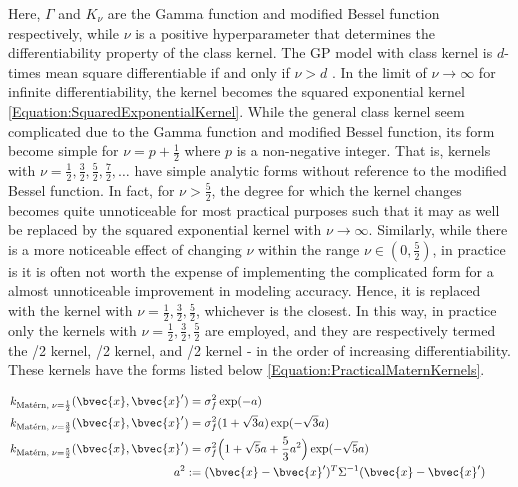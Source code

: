 				Here, $\Gamma$ and $K_{\nu}$ are the Gamma function and modified Bessel function respectively, while $\nu$ is a positive hyperparameter that determines the differentiability property of the \matern class kernel. The GP model with \matern class kernel is $d$-times mean square differentiable if and only if $\nu > d$ \citep{GaussianProcessForMachineLearning}. In the limit of $\nu \rightarrow \infty$ for infinite differentiability, the \matern kernel becomes the squared exponential kernel \eqref{Equation:SquaredExponentialKernel}. While the general \matern class kernel seem complicated due to the Gamma function and modified Bessel function, its form become simple for $\nu = p + \frac{1}{2}$ where $p$ is a non-negative integer. That is, \matern kernels with $\nu = \frac{1}{2}, \frac{3}{2}, \frac{5}{2}, \frac{7}{2}, \dots$ have simple analytic forms without reference to the modified Bessel function. In fact, for $\nu > \frac{5}{2}$, the degree for which the \matern kernel changes becomes quite unnoticeable for most practical purposes such that it may as well be replaced by the squared exponential kernel with $\nu \rightarrow \infty$. Similarly, while there is a more noticeable effect of changing $\nu$ within the range $\nu \in (0, \frac{5}{2})$, in practice is it is often not worth the expense of implementing the complicated form for a almost unnoticeable improvement in modeling accuracy. Hence, it is replaced with the \matern kernel with $\nu = \frac{1}{2}, \frac{3}{2}, \frac{5}{2}$, whichever is the closest. In this way, in practice only the \matern kernels with $\nu = \frac{1}{2}, \frac{3}{2}, \frac{5}{2}$ are employed, and they are respectively termed the /2 kernel, /2 kernel, and /2 kernel - in the order of increasing differentiability. These kernels have the forms listed below \eqref{Equation:PracticalMaternKernels}.
				
				\begin{equation}
					\left.
						\begin{aligned}
							k_{\mathrm{\maternmath}, \; \nu = \frac{1}{2}}(\bvec{x}, \bvec{x}') =& \; \sigma_{f}^{2} \exp ( -a ) \\
							k_{\mathrm{\maternmath}, \; \nu = \frac{3}{2}}(\bvec{x}, \bvec{x}') =& \; \sigma_{f}^{2} (1 + \sqrt{3} a) \exp ( -\sqrt{3} a ) \\
							k_{\mathrm{\maternmath}, \; \nu = \frac{5}{2}}(\bvec{x}, \bvec{x}') =& \; \sigma_{f}^{2} \Big(1 + \sqrt{5} a + \frac{5}{3} a^{2}\Big) \exp ( -\sqrt{5} a )  \\
							a^{2} :=& \; (\bvec{x} - \bvec{x}')^{T} \Sigma^{-1} (\bvec{x} - \bvec{x}')
						\end{aligned}
					\qquad \right.
				\label{Equation:PracticalMaternKernels}
				\end{equation}			
				

